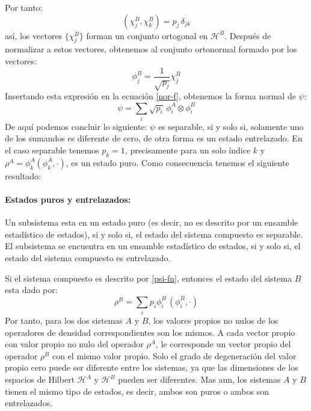 \documentclass[12pt]{book}
\numberwithin{equation}{chapter}
\def\H{\mathcal{H}}
\def\pr{\otimes}
\begin{document}
Por tanto:
$$ ( \chi_{j}^{B},\chi_{k}^{B} )= p_{j}\, \delta_{jk} $$
as\'i, los vectores $\{ \chi_{j}^{B} \}$ forman un conjunto ortogonal en $\H^{B}$. Despu\'es de normalizar a estos vectores, obtenemos al conjunto ortonormal formado por los vectores:
\begin{equation}
\phi_{j}^{B}= \frac{1}{\sqrt{p_{j}}} \chi_{j}^{B}
\end{equation} 
Insertando esta expresi\'on en la ecuaci\'on \eqref{nor-f}, obtenemos la forma normal de $\psi$: 
\begin{equation}\label{psi-fn}
\psi= \sum_{i} \sqrt{p_{i}}\, \phi_{i}^{A} \pr \phi_{i}^{B}
\end{equation}
De aqu\'i podemos concluir lo siguiente: $\psi$ es separable, si y solo si, solamente uno de los sumandos es diferente de cero, de otra forma es un estado entrelazado. En el caso separable tenemos $p_{k}=1$, precisamente para un solo \'indice $k$ y $\rho^{A}= \phi_{k}^{A} ( \phi_{k}^{A}, \cdot ) $, es un estado puro. Como consecuencia tenemos el siguiente resultado:

\paragraph{Estados puros y entrelazados:} Un subsistema esta en un estado puro (es decir, no es descrito por un ensamble estad\'istico de estados), si y solo si, el estado del sistema compuesto es separable. El subsistema se encuentra en un ensamble estad\'istico de estados, si y solo si, el estado del sistema compuesto es entrelazado.

\rightline{$\dag$}
\vspace{5 mm}
     
Si el sistema compuesto es descrito por \eqref{psi-fn}, entonces el estado del sistema $B$ esta dado por:
\begin{equation}
\rho^{B}= \sum_{i} p_{i} \phi_{i}^{B}\, ( \phi_{i}^{B}, \cdot )
\end{equation}
Por tanto, para los dos sistemas $A$ y $B$, los valores propios no nulos de los operadores de densidad correspondientes son los mismos. A cada vector propio   con valor propio no nulo del operador $\rho^{A}$, le corresponde un vector propio del operador $\rho^{B}$ con el mismo valor propio. Solo el grado de degeneraci\'on del valor propio cero puede ser diferente entre los sistemas, ya que las dimensiones de los espacios de Hilbert $\H^{A}$ y $\H^{B}$ pueden ser diferentes. Mas aun, los sistemas $A$ y $B$ tienen el mismo tipo de estados, es decir, ambos son puros o ambos son entrelazados.     
\end{document}
